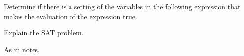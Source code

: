 \begin{questions}
\question
Determine if there is a setting of the variables in the following expression that makes the evaluation of the expression true.

\begin{solution}
\end{solution}


\question
Explain the SAT problem.
\begin{solution}
As in notes.
\end{solution}


\end{questions}
